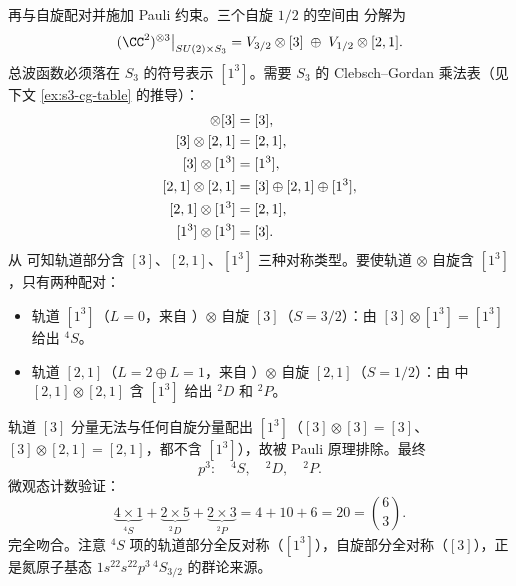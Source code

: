 \begin{example}[{$p^3$ 构型：$S_3$ 约束给出 $^4S,{}^2D,{}^2P$}]
再与自旋配对并施加 Pauli 约束。三个自旋 $1/2$ 的空间由  分解为
\[
(\CC^2)^{\otimes3}\big|_{SU(2)\times S_3}
=V_{3/2}\otimes[3]\;\oplus\;V_{1/2}\otimes[2,1].
\]
总波函数必须落在 $S_3$ 的符号表示 $[1^3]$。需要 $S_3$ 的 Clebsch--Gordan 乘法表（见下文 \cref{ex:s3-cg-table} 的推导）：
\begin{align}
[3]\otimes[3]&=[3],\notag\\
[3]\otimes[2,1]&=[2,1],\notag\\
[3]\otimes[1^3]&=[1^3],\notag\\
[2,1]\otimes[2,1]&=[3]\oplus[2,1]\oplus[1^3],\label{eq:s3-cg-21-21}\\
[2,1]\otimes[1^3]&=[2,1],\notag\\
[1^3]\otimes[1^3]&=[3].\notag
\end{align}
从  可知轨道部分含 $[3]$、$[2,1]$、$[1^3]$ 三种对称类型。要使轨道 $\otimes$ 自旋含 $[1^3]$，只有两种配对：
\begin{itemize}
\item 轨道 $[1^3]$（$L=0$，来自 ）$\otimes$ 自旋 $[3]$（$S=3/2$）：由 $[3]\otimes[1^3]=[1^3]$ 给出 $^4S$。
\item 轨道 $[2,1]$（$L=2\oplus L=1$，来自 ）$\otimes$ 自旋 $[2,1]$（$S=1/2$）：由  中 $[2,1]\otimes[2,1]$ 含 $[1^3]$ 给出 $^2D$ 和 $^2P$。
\end{itemize}
轨道 $[3]$ 分量无法与任何自旋分量配出 $[1^3]$（$[3]\otimes[3]=[3]$、$[3]\otimes[2,1]=[2,1]$，都不含 $[1^3]$），故被 Pauli 原理排除。最终
\[
p^3:\quad{}^4S,\quad{}^2D,\quad{}^2P.
\]
微观态计数验证：
\[
\underbrace{4\times1}_{^4S}+\underbrace{2\times5}_{^2D}+\underbrace{2\times3}_{^2P}=4+10+6=20=\binom63.
\]
完全吻合。注意 $^4S$ 项的轨道部分全反对称（$[1^3]$），自旋部分全对称（$[3]$），正是氮原子基态 $1s^22s^22p^3\,{}^4S_{3/2}$ 的群论来源。
\end{example}

